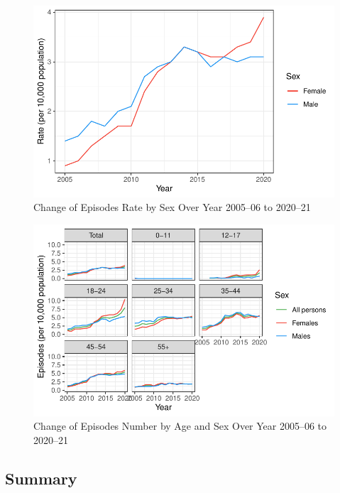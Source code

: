 \documentclass[
  a4paper,
  DIV=11,
  numbers=noendperiod]{scrreport}
\begin{document}
\begin{figure}

\caption{\label{fig-rmhc-cras}Change of Episodes Rate by Sex Over Year
2005--06 to 2020--21}

{\centering \includegraphics{./chap4-rmhc_files/figure-pdf/fig-rmhc-cras-1.pdf}

}

\end{figure}

\begin{figure}

\caption{\label{fig-rmhc-cnas}Change of Episodes Number by Age and Sex
Over Year 2005--06 to 2020--21}

{\centering \includegraphics{./chap4-rmhc_files/figure-pdf/fig-rmhc-cnas-1.pdf}

}

\end{figure}

\hypertarget{summary-9}{%
\subsection{Summary}\label{summary-9}}
\end{document}
